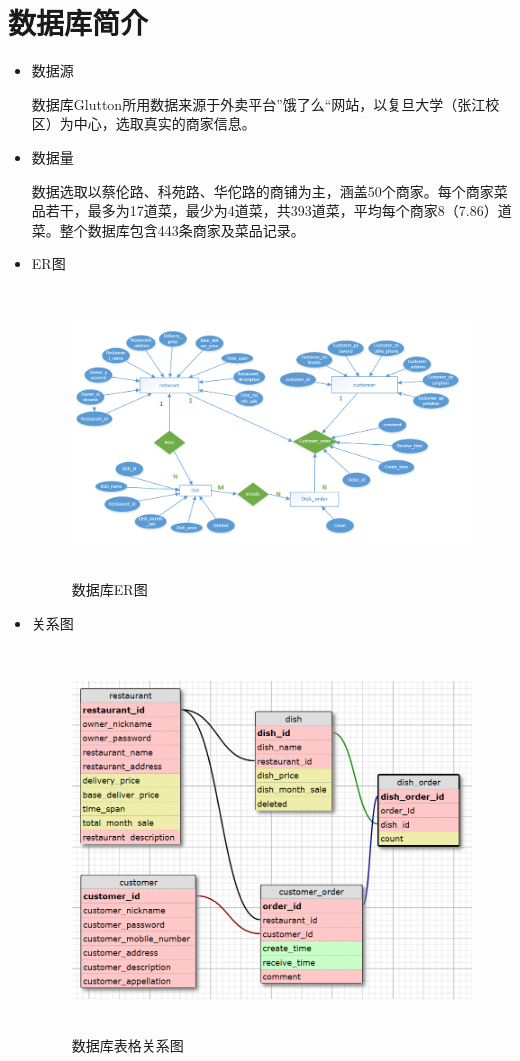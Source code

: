\documentclass[12pt, oneside,a4paper]{article}
\begin{document}
\section{数据库简介}
 \begin{itemize}
 \item 数据源
  \par\setlength{\parindent}{1em}\normalsize 数据库Glutton所用数据来源于外卖平台”饿了么“网站，以复旦大学（张江校区）为中心，选取真实的商家信息。
 \item 数据量
  \par\setlength{\parindent}{1em}\normalsize 数据选取以蔡伦路、科苑路、华佗路的商铺为主，涵盖50个商家。每个商家菜品若干，最多为17道菜，最少为4道菜，共393道菜，平均每个商家8（7.86）道菜。整个数据库包含443条商家及菜品记录。
 \item ER图
  \begin{figure}[H]
   \centering
     \includegraphics[width=5.00in,height=3.00in]{ER.png}
     \caption{\small{数据库ER图}}\label{fig:dummy}
  \end{figure}
 
 \item 关系图
  \begin{figure}[H]
    \centering
     \includegraphics[width=6.00in,height=4.00in]{tables.png}
     \caption{\small{数据库表格关系图}}\label{fig:dummy}
  \end{figure}
  

\end{itemize}
\end{document}
